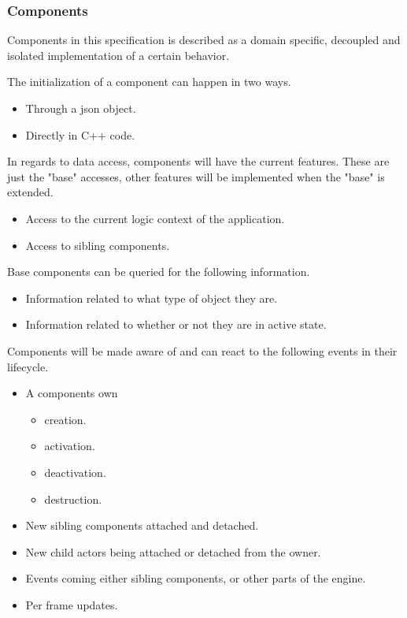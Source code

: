 \subsubsection*{Components}
Components in this specification is described as a domain specific, decoupled and isolated
implementation of a certain behavior.

The initialization of a component can happen in two ways.
\begin{itemize}
    \item
    Through a json object.

    \item
    Directly in C++ code.
\end{itemize}

In regards to data access, components will have the current features.
These are just the "base" accesses, other features will be implemented when the "base" is extended.
\begin{itemize}
    \item
    Access to the current logic context of the application.

    \item
    Access to sibling components.
\end{itemize}

Base components can be queried for the following information.
\begin{itemize}
    \item
    Information related to what type of object they are.

    \item
    Information related to whether or not they are in active state.
\end{itemize}

Components will be made aware of and can react to the following events in their lifecycle.
\begin{itemize}
    \item 
    A components own
    \begin{itemize}
        \item creation.
        \item activation.
        \item deactivation.
        \item destruction.
    \end{itemize}

    \item
    New sibling components attached and detached.

    \item
    New child actors being attached or detached from the owner.

    \item
    Events coming either sibling components, or other parts of the engine.

    \item
    Per frame updates.
\end{itemize}

